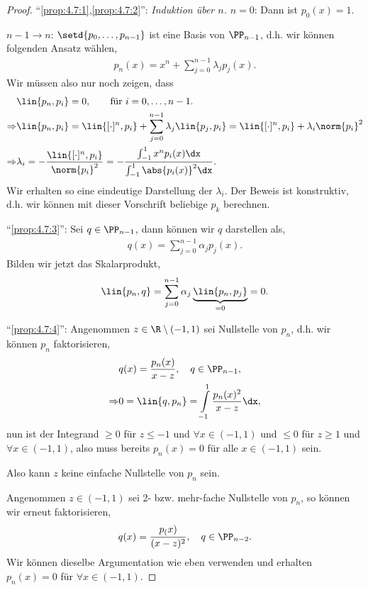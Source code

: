 \begin{proof}
``\ref{prop:4.7:1},\ref{prop:4.7:2}'': \textit{Induktion über $n$.}
$n=0$: Dann ist $p_0(x) = 1$.

$n-1\to n$: $\setd{p_0,\ldots,p_{n-1}}$ ist eine Basis von $\PP_{n-1}$, d.h.
wir können folgenden Ansatz wählen,
\begin{align*}
p_n(x) = x^n + \sum\limits_{j=0}^{n-1} \lambda_j p_j(x).
\end{align*}
Wir müssen also nur noch zeigen, dass
\begin{align*}
&\lin{p_n,p_i} = 0,\qquad \text{für } i = 0,\ldots,n-1.\\
\Rightarrow & \lin{p_n,p_i} = \lin{[\cdot]^n,p_i} + \sum\limits_{j=0}^{n-1}
\lambda_j \lin{p_j,p_i} 
= \lin{[\cdot]^n,p_i} + \lambda_i \norm{p_i}^2\\
\Rightarrow & \lambda_i = -\frac{\lin{[\cdot]^n,p_i}}{\norm{p_i}^2} = 
-\frac{\int_{-1}^1 x^np_i(x)\dx}{\int_{-1}^1 \abs{p_i(x)}^2\dx}. 
\end{align*}
Wir erhalten so eine eindeutige Darstellung der $\lambda_i$.
Der Beweis ist konstruktiv, d.h. wir können mit dieser Vorschrift beliebige
$p_k$ berechnen. 

``\ref{prop:4.7:3}'': Sei $q\in\PP_{n-1}$, dann können wir $q$ darstellen als,
\begin{align*}
q(x) = \sum\limits_{j=0}^{n-1} \alpha_j p_j(x).
\end{align*}
Bilden wir jetzt das Skalarprodukt,
\begin{align*}
\lin{p_n,q} = \sum\limits_{j=0}^{n-1}\alpha_j \underbrace{\lin{p_n,p_j}}_{=0} =
0.
\end{align*}

``\ref{prop:4.7:4}'': Angenommen $z\in\R\setminus(-1,1)$ sei Nullstelle von
$p_n$, d.h. wir können $p_n$ faktorisieren,
\begin{align*}
&q(x) = \frac{p_n(x)}{x-z},\quad q\in \PP_{n-1},\\
\Rightarrow & 0 = \lin{q,p_n} = \int\limits_{-1}^1
\frac{p_n(x)^2}{x-z}\dx,
\end{align*}
nun ist der Integrand $\ge 0$ für $z\le -1$ und $\forall x\in (-1,1)$ und $\le
0$ für $z\ge 1$ und $\forall x\in(-1,1)$, also muss bereits $p_n(x) = 0$ für
alle $x\in(-1,1)$ sein.\dipper

Also kann $z$ keine einfache Nullstelle von $p_n$ sein.

Angenommen $z\in(-1,1)$ sei 2- bzw. mehr-fache Nullstelle von $p_n$,
so können wir erneut faktorisieren,
\begin{align*}
q(x) = \frac{p_(x)}{(x-z)^2},\quad q\in\PP_{n-2}.
\end{align*}
Wir können dieselbe Argumentation wie eben verwenden und erhalten $p_n(x) =
0$ für $\forall x\in(-1,1)$.


\end{proof}
